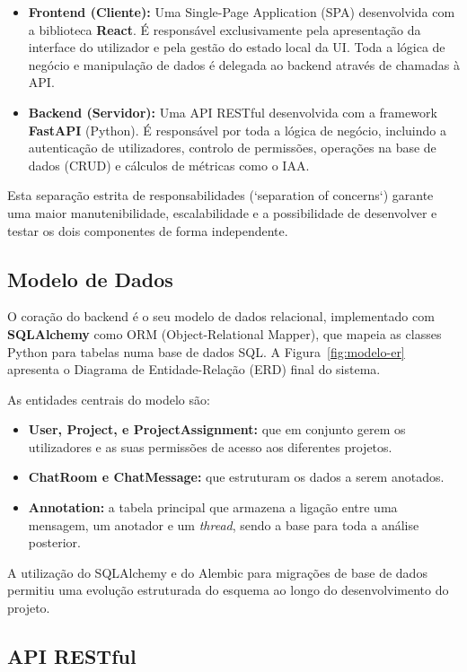 \begin{itemize}
    \item \textbf{Frontend (Cliente):} Uma Single-Page Application (SPA) desenvolvida com a biblioteca \textbf{React}. É responsável exclusivamente pela apresentação da interface do utilizador e pela gestão do estado local da UI. Toda a lógica de negócio e manipulação de dados é delegada ao backend através de chamadas à API.
    \item \textbf{Backend (Servidor):} Uma API RESTful desenvolvida com a framework \textbf{FastAPI} (Python). É responsável por toda a lógica de negócio, incluindo a autenticação de utilizadores, controlo de permissões, operações na base de dados (CRUD) e cálculos de métricas como o IAA.
\end{itemize}
Esta separação estrita de responsabilidades (`separation of concerns`) garante uma maior manutenibilidade, escalabilidade e a possibilidade de desenvolver e testar os dois componentes de forma independente.

\subsection{Modelo de Dados}

O coração do backend é o seu modelo de dados relacional, implementado com \textbf{SQLAlchemy} como ORM (Object-Relational Mapper), que mapeia as classes Python para tabelas numa base de dados SQL. A Figura~\ref{fig:modelo-er} apresenta o Diagrama de Entidade-Relação (ERD) final do sistema.

As entidades centrais do modelo são:
\begin{itemize}
    \item \textbf{User, Project, e ProjectAssignment:} que em conjunto gerem os utilizadores e as suas permissões de acesso aos diferentes projetos.
    \item \textbf{ChatRoom e ChatMessage:} que estruturam os dados a serem anotados.
    \item \textbf{Annotation:} a tabela principal que armazena a ligação entre uma mensagem, um anotador e um \textit{thread}, sendo a base para toda a análise posterior.
\end{itemize}
A utilização do SQLAlchemy e do Alembic para migrações de base de dados permitiu uma evolução estruturada do esquema ao longo do desenvolvimento do projeto.

\subsection{API RESTful}

